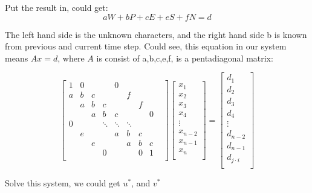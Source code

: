 \documentclass[12pt]{article}
\begin{document}
Put the result in, could get:
$$
aW + bP + cE + eS + fN = d
$$


The left hand side is the unknown characters, and the right hand side b is known from previous and current time step. Could see, this equation in our system means $Ax = d$, where $A$ is consist of a,b,c,e,f, is a pentadiagonal matrix:


\[
\begin{bmatrix}
1 & 0 &   &   & 0 &   &    &\\
a & b & c &   &   & f &    &\\
  & a & b & c &   &   & f  &\\
  &   & a & b & c &   &    & 0\\
0 &   &   & \ddots & \ddots & \ddots &  &  \\
  & e &   &   & a & b & c &   &\\
  &   & e &   &   & a & b & c \\
  &   &   & 0 &   &   & 0 & 1 \\
\end{bmatrix}
\begin{bmatrix}
x_1 \\
x_2 \\
x_3 \\
x_4 \\
\vdots \\
x_{n-2} \\
x_{n-1} \\
x_n \\
\end{bmatrix}
=
\begin{bmatrix}
d_1 \\
d_2 \\
d_3 \\
d_4 \\
\vdots \\
d_{n-2} \\
d_{n-1} \\
d_{j\cdot i} \\
\end{bmatrix}
\]


Solve this system, we could get $u^*$, and $v^*$\\






    
\end{document}
